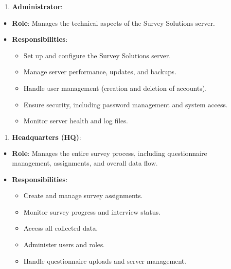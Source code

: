 \documentclass[
  letterpaper,
  DIV=11,
  numbers=noendperiod]{scrreprt}
\providecommand{\tightlist}{%
  \setlength{\itemsep}{0pt}\setlength{\parskip}{0pt}}\usepackage{longtable,booktabs,array}
\begin{document}
\begin{enumerate}
\def\labelenumi{\arabic{enumi}.}
\tightlist
\item
  \textbf{Administrator}:
\end{enumerate}

\begin{itemize}
\item
  \textbf{Role}: Manages the technical aspects of the Survey Solutions
  server.
\item
  \textbf{Responsibilities}:

  \begin{itemize}
  \item
    Set up and configure the Survey Solutions server.
  \item
    Manage server performance, updates, and backups.
  \item
    Handle user management (creation and deletion of accounts).
  \item
    Ensure security, including password management and system access.
  \item
    Monitor server health and log files.
  \end{itemize}
\end{itemize}

\begin{enumerate}
\def\labelenumi{\arabic{enumi}.}
\setcounter{enumi}{1}
\tightlist
\item
  \textbf{Headquarters (HQ)}:
\end{enumerate}

\begin{itemize}
\item
  \textbf{Role}: Manages the entire survey process, including
  questionnaire management, assignments, and overall data flow.
\item
  \textbf{Responsibilities}:

  \begin{itemize}
  \item
    Create and manage survey assignments.
  \item
    Monitor survey progress and interview status.
  \item
    Access all collected data.
  \item
    Administer users and roles.
  \item
    Handle questionnaire uploads and server management.
  \end{itemize}
\end{itemize}
\end{document}
